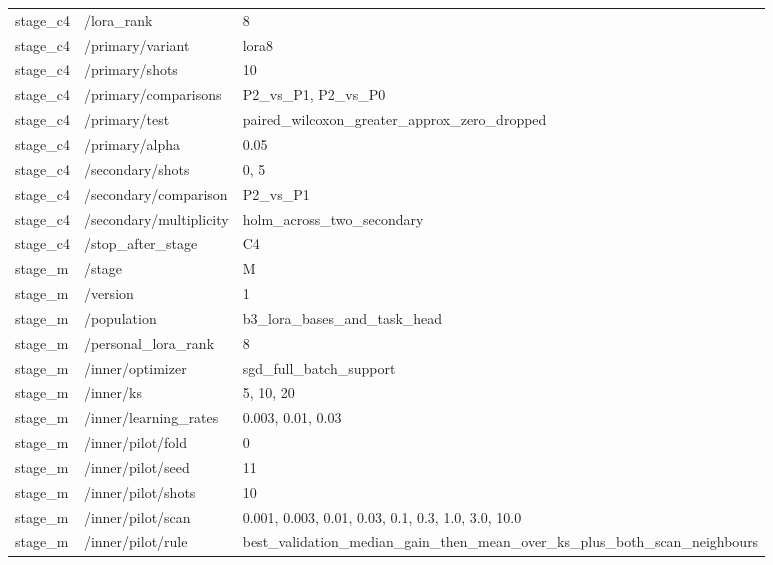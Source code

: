 \begin{longtable}{p{.65in}p{2.8in}p{3.2in}}
stage\_\allowbreak{}c4 & /lora\_\allowbreak{}rank & 8 \\
stage\_\allowbreak{}c4 & /primary/variant & lora8 \\
stage\_\allowbreak{}c4 & /primary/shots & 10 \\
stage\_\allowbreak{}c4 & /primary/comparisons & P2\_\allowbreak{}vs\_\allowbreak{}P1, P2\_\allowbreak{}vs\_\allowbreak{}P0 \\
stage\_\allowbreak{}c4 & /primary/test & paired\_\allowbreak{}wilcoxon\_\allowbreak{}greater\_\allowbreak{}approx\_\allowbreak{}zero\_\allowbreak{}dropped \\
stage\_\allowbreak{}c4 & /primary/alpha & 0.05 \\
stage\_\allowbreak{}c4 & /secondary/shots & 0, 5 \\
stage\_\allowbreak{}c4 & /secondary/comparison & P2\_\allowbreak{}vs\_\allowbreak{}P1 \\
stage\_\allowbreak{}c4 & /secondary/multiplicity & holm\_\allowbreak{}across\_\allowbreak{}two\_\allowbreak{}secondary \\
stage\_\allowbreak{}c4 & /stop\_\allowbreak{}after\_\allowbreak{}stage & C4 \\
stage\_\allowbreak{}m & /stage & M \\
stage\_\allowbreak{}m & /version & 1 \\
stage\_\allowbreak{}m & /population & b3\_\allowbreak{}lora\_\allowbreak{}bases\_\allowbreak{}and\_\allowbreak{}task\_\allowbreak{}head \\
stage\_\allowbreak{}m & /personal\_\allowbreak{}lora\_\allowbreak{}rank & 8 \\
stage\_\allowbreak{}m & /inner/optimizer & sgd\_\allowbreak{}full\_\allowbreak{}batch\_\allowbreak{}support \\
stage\_\allowbreak{}m & /inner/ks & 5, 10, 20 \\
stage\_\allowbreak{}m & /inner/learning\_\allowbreak{}rates & 0.003, 0.01, 0.03 \\
stage\_\allowbreak{}m & /inner/pilot/fold & 0 \\
stage\_\allowbreak{}m & /inner/pilot/seed & 11 \\
stage\_\allowbreak{}m & /inner/pilot/shots & 10 \\
stage\_\allowbreak{}m & /inner/pilot/scan & 0.001, 0.003, 0.01, 0.03, 0.1, 0.3, 1.0, 3.0, 10.0 \\
stage\_\allowbreak{}m & /inner/pilot/rule & best\_\allowbreak{}validation\_\allowbreak{}median\_\allowbreak{}gain\_\allowbreak{}then\_\allowbreak{}mean\_\allowbreak{}over\_\allowbreak{}ks\_\allowbreak{}plus\_\allowbreak{}both\_\allowbreak{}scan\_\allowbreak{}neighbours \\

\end{longtable}
